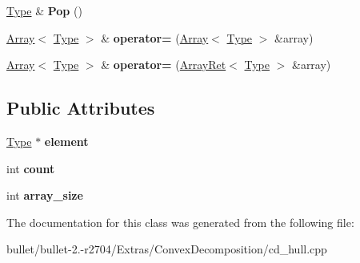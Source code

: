 \begin{DoxyCompactItemize}
\item 
\hypertarget{class_convex_decomposition_1_1_array_aefd55aba63d89a128c624e3c0896aeb4}{\hyperlink{struct_type}{Type} \& {\bfseries Pop} ()}\label{class_convex_decomposition_1_1_array_aefd55aba63d89a128c624e3c0896aeb4}

\item 
\hypertarget{class_convex_decomposition_1_1_array_a5738563a34e589458f14cf388b40eb7f}{\hyperlink{class_convex_decomposition_1_1_array}{Array}$<$ \hyperlink{struct_type}{Type} $>$ \& {\bfseries operator=} (\hyperlink{class_convex_decomposition_1_1_array}{Array}$<$ \hyperlink{struct_type}{Type} $>$ \&array)}\label{class_convex_decomposition_1_1_array_a5738563a34e589458f14cf388b40eb7f}

\item 
\hypertarget{class_convex_decomposition_1_1_array_a8e79e9bb055c9dc3d7da421a96f223da}{\hyperlink{class_convex_decomposition_1_1_array}{Array}$<$ \hyperlink{struct_type}{Type} $>$ \& {\bfseries operator=} (\hyperlink{singleton_convex_decomposition_1_1_array_ret}{Array\+Ret}$<$ \hyperlink{struct_type}{Type} $>$ \&array)}\label{class_convex_decomposition_1_1_array_a8e79e9bb055c9dc3d7da421a96f223da}

\end{DoxyCompactItemize}
\subsection*{Public Attributes}
\begin{DoxyCompactItemize}
\item 
\hypertarget{class_convex_decomposition_1_1_array_a72d2fa90fd51ff5ef6a6778f5dd24840}{\hyperlink{struct_type}{Type} $\ast$ {\bfseries element}}\label{class_convex_decomposition_1_1_array_a72d2fa90fd51ff5ef6a6778f5dd24840}

\item 
\hypertarget{class_convex_decomposition_1_1_array_abe7b0c9fc4f7279f82b3660f1bee4ff0}{int {\bfseries count}}\label{class_convex_decomposition_1_1_array_abe7b0c9fc4f7279f82b3660f1bee4ff0}

\item 
\hypertarget{class_convex_decomposition_1_1_array_a48a4995692279f809b73e668ca875c5f}{int {\bfseries array\+\_\+size}}\label{class_convex_decomposition_1_1_array_a48a4995692279f809b73e668ca875c5f}

\end{DoxyCompactItemize}


The documentation for this class was generated from the following file\+:\begin{DoxyCompactItemize}
\item 
bullet/bullet-\/2.-\/r2704/\+Extras/\+Convex\+Decomposition/cd\+\_\+hull.\+cpp\end{DoxyCompactItemize}
